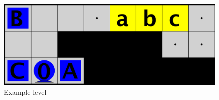 \begin{figure}[h!]
  \centering
  \includegraphics[width=.6\columnwidth]{graphics/ordering_issue.png}
  \caption{\label{fig:examplelev}Example level}
\end{figure}

